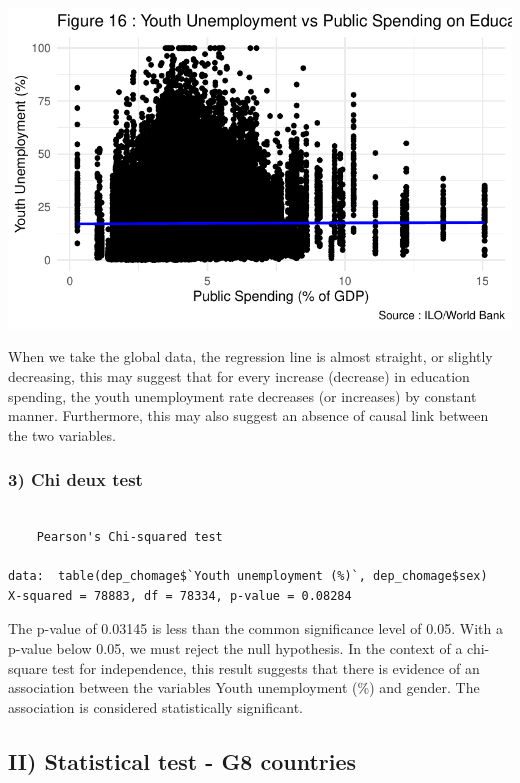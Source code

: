 \documentclass[
  letterpaper,
  DIV=11,
  numbers=noendperiod]{scrartcl}
\begin{document}
\includegraphics{Projet-BM_files/figure-pdf/unnamed-chunk-35-1.pdf}

When we take the global data, the regression line is almost straight, or
slightly decreasing, this may suggest that for every increase (decrease)
in education spending, the youth unemployment rate decreases (or
increases) by constant manner. Furthermore, this may also suggest an
absence of causal link between the two variables.

\hypertarget{chi-deux-test}{%
\subsubsection{3) Chi deux test}\label{chi-deux-test}}

\begin{verbatim}

    Pearson's Chi-squared test

data:  table(dep_chomage$`Youth unemployment (%)`, dep_chomage$sex)
X-squared = 78883, df = 78334, p-value = 0.08284
\end{verbatim}

The p-value of 0.03145 is less than the common significance level of
0.05. With a p-value below 0.05, we must reject the null hypothesis. In
the context of a chi-square test for independence, this result suggests
that there is evidence of an association between the variables Youth
unemployment (\%) and gender. The association is considered
statistically significant.

\hypertarget{ii-statistical-test---g8-countries}{%
\subsection{II) Statistical test - G8
countries}\label{ii-statistical-test---g8-countries}}
\end{document}

